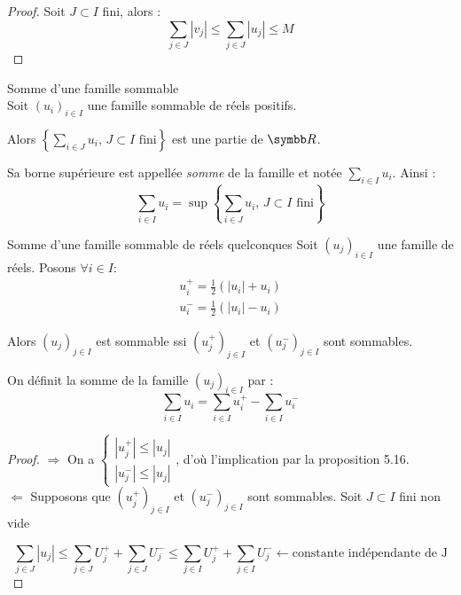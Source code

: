 \begin{proof}
    Soit $J \subset I$ fini, alors :
    \[\sum_{j \in J} |v_j| \leqslant \sum_{j \in J} |u_j| \leqslant M\]
\end{proof}


\begin{definition}{Somme d'une famille sommable}{}\\
    Soit $(u_i)_{i \in I}$ une famille sommable de réels positifs. 

    Alors $\displaystyle \left\{ \sum_{i \in J} u_i, \, J \subset I \text{ fini}  \right\}$ est une partie 
    de $\R$. 

    Sa borne supérieure est appellée \emph{somme} de la famille et notée $\displaystyle \sum_{i \in I} u_i$.
    Ainsi : \[\sum_{i \in I} u_i = \sup \left\{ \sum_{i \in J} u_i, \, J \subset I \text{ fini}  \right\}\]
\end{definition}

\begin{theoreme}{Somme d'une famille sommable de réels quelconques}{}
    Soit $(u_j)_{i \in I}$ une famille de réels. 
    Posons $\forall i \in I : $ 
    \begin{align*}
        u_i^+ = \frac 1 2 (|u_i| + u_i)\\
        u_i^- = \frac 1 2 (|u_i| - u_i)
    \end{align*}

    Alors $(u_j)_{j\in I}$ est sommable ssi $(u_j^+)_{j\in I}$ et $(u_j^-)_{j\in I}$ sont sommables.

    On définit la somme de la famille $(u_j)_{i \in I}$ par :
    \[\sum_{i \in I} u_i = \sum_{i \in I} u_i^+ - \sum_{i \in I} u_i^-\]
\end{theoreme}


\begin{proof}{}{}
    $\Rightarrow$ On a $\left\{\begin{array}{cc}
        |u_j^+| \leqslant |u_j|\\
        |u_j^-| \leqslant |u_j|
    \end{array}\right.$, d'où l'implication par la proposition 5.16.\\

    $\Leftarrow$ Supposons que $(u_j^+)_{j\in I}$ et $(u_j^-)_{j\in I}$ sont sommables. Soit $J\subset I$ fini non vide

    \[\sum_{j\in J} |u_j|\leqslant\sum_{j\in J} U_j^+ + \sum_{j\in J} U_j^-\leqslant \sum_{j\in I} U_j^+ + \sum_{j\in I} U_j^- \leftarrow\text{constante indépendante de J}\]
\end{proof}

